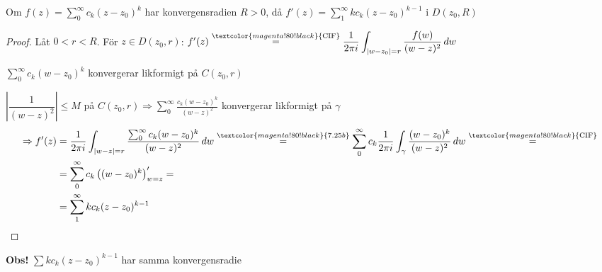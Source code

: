 \begin{theorem}[Sats 8.2]
Om $f(z) = \sum_0^\infty c_k(z - z_0)^k$ har konvergensradien $R > 0$, då $f'(z) = \sum_1^\infty kc_k(z - z_0)^{k-1}$ i $D(z_0, R)$
\end{theorem}
\begin{proof}
Låt $0 < r < R$. För $z \in D(z_0, r)$: $f'(z) \overset{\textcolor{magenta!80!black}{\text{CIF}}}{=} \dfrac{1}{2\pi i} \displaystyle\int_{|w - z_0| = r} \frac{f(w)}{(w - z)^2}\,dw$

$\sum_0^\infty c_k(w - z_0)^k$ konvergerar likformigt på $C(z_0, r)$

$\left| \dfrac{1}{(w - z)^2} \right| \le M$ på $C(z_0, r) \Rightarrow \displaystyle\sum_0^\infty \frac{c_k(w - z_0)^k}{(w - z)^2}$ konvergerar likformigt på $\gamma$
\begin{align*}
  \Rightarrow f'(z) &= \frac{1}{2\pi i} \int_{|w - z| = r} \frac{\sum_0^\infty c_k(w - z_0)^k}{(w - z)^2}\,dw \overset{\textcolor{magenta!80!black}{7.25b}}{=} \sum_0^\infty c_k \frac{1}{2\pi i} \int_\gamma \frac{(w - z_0)^k}{(w - z)^2}\,dw \overset{\textcolor{magenta!80!black}{\text{CIF}}}{=} \\
  &= \sum_0^\infty c_k\left( (w - z_0)^k \right)'_{w = z} = \\
  &= \sum_1^\infty kc_k(z - z_0)^{k-1}
\end{align*}
\end{proof}

\textcolor{red!70!black}{\textbf{Obs!}} $\sum kc_k(z - z_0)^{k-1}$ har samma konvergensradie
